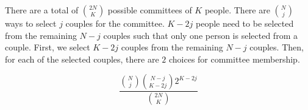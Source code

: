 There are a total of $\binom{2N}{K}$ possible committees of $K$ people. 
There are $\binom{N}{j}$ ways to select $j$ couples for the committee. 
$K-2j$ people need to be selected from the remaining $N-j$ couples such 
that only one person is selected from a couple. First, we select $K-2j$ 
couples from the remaining $N-j$ couples. Then, for each of the selected 
couples, there are $2$ choices for committee membership.

$$\frac{\binom{N}{j}\binom{N-j}{K-2j}2^{K-2j}}{\binom{2N}{K}}$$